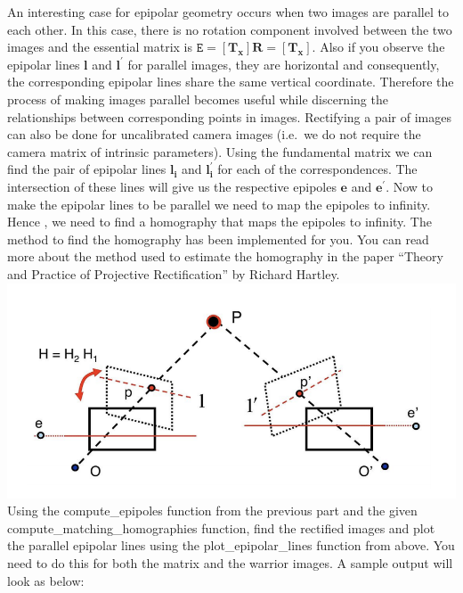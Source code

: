 \documentclass[11pt]{article}
\begin{document}
An interesting case for epipolar geometry occurs when two images are
parallel to each other. In this case, there is no rotation component
involved between the two images and the essential matrix is
\(\texttt{E}=[\boldsymbol{T_{x}}]\boldsymbol{R}=[\boldsymbol{T_{x}}]\).
Also if you observe the epipolar lines \(\boldsymbol{l}\) and
\(\boldsymbol{l^{'}}\) for parallel images, they are horizontal and
consequently, the corresponding epipolar lines share the same vertical
coordinate. Therefore the process of making images parallel becomes
useful while discerning the relationships between corresponding points
in images. Rectifying a pair of images can also be done for uncalibrated
camera images (i.e.~we do not require the camera matrix of intrinsic
parameters). Using the fundamental matrix we can find the pair of
epipolar lines \(\boldsymbol{l_i}\) and \(\boldsymbol{l^{'}_i}\) for
each of the correspondences. The intersection of these lines will give
us the respective epipoles \(\boldsymbol{e}\) and
\(\boldsymbol{e^{'}}\). Now to make the epipolar lines to be parallel we
need to map the epipoles to infinity. Hence , we need to find a
homography that maps the epipoles to infinity. The method to find the
homography has been implemented for you. You can read more about the
method used to estimate the homography in the paper ``Theory and
Practice of Projective Rectification'' by Richard Hartley.
\includegraphics{image_rectification.png} Using the compute\_epipoles
function from the previous part and the given
compute\_matching\_homographies function, find the rectified images and
plot the parallel epipolar lines using the plot\_epipolar\_lines
function from above. You need to do this for both the matrix and the
warrior images. A sample output will look as below:
\end{document}
